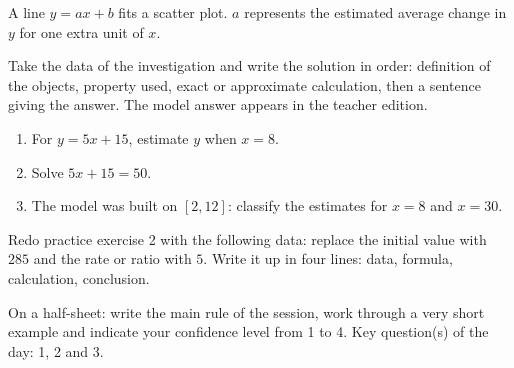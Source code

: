 \begin{traceecrite}A line $y=ax+b$ fits a scatter plot. $a$ represents the estimated average change in $y$ for one extra unit of $x$.\end{traceecrite}

\begin{exemple}
Take the data of the investigation and write the solution in order: definition of the objects, property used, exact or approximate calculation, then a sentence giving the answer. The model answer appears in the teacher edition.
\end{exemple}

\begin{exercice}[-- essential]
\begin{enumerate}\item For $y=5x+15$, estimate $y$ when $x=8$.\item Solve $5x+15=50$.\item The model was built on $[2,12]$: classify the estimates for $x=8$ and $x=30$.\end{enumerate}
\end{exercice}


\begin{dm}Redo practice exercise 2 with the following data: replace the initial value with $285$ and the rate or ratio with $5$. Write it up in four lines: data, formula, calculation, conclusion.\end{dm}

\begin{sortie}On a half-sheet: write the main rule of the session, work through a very short example and indicate your confidence level from 1 to 4. Key question(s) of the day: 1, 2 and 3.\end{sortie}


